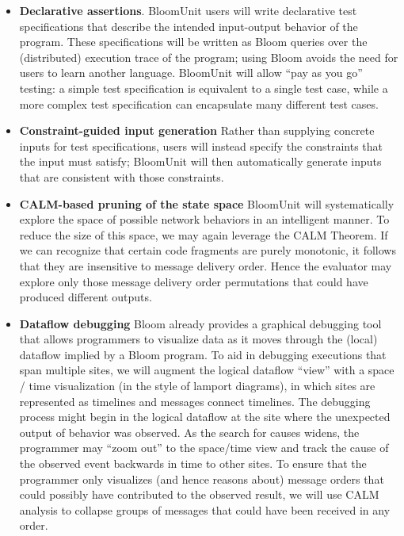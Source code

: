 \begin{itemize}
\item \textbf{Declarative assertions}.
BloomUnit users will write declarative test specifications that describe the 
intended input-output behavior of the program. These specifications will be 
written 
as Bloom queries over the (distributed) execution trace of the program; 
using Bloom avoids the need for users to learn another language. 
BloomUnit will allow ``pay as you go'' testing: a simple test specification 
is equivalent to a single test case, while a more complex test specification 
can encapsulate many different test cases.


\item \textbf{Constraint-guided input generation}
Rather than supplying concrete inputs for test specifications, users will 
instead 
specify the constraints that the input must satisfy; BloomUnit will then 
automatically generate inputs that are consistent with those constraints.

\item \textbf{CALM-based pruning of the state space}
BloomUnit will systematically explore the space of
possible network behaviors in an intelligent manner. To reduce the size of this space, we may again
leverage the CALM Theorem.
If we can recognize that certain code fragments are purely monotonic, it follows 
that they are insensitive to message delivery order.
Hence the evaluator may explore only those message delivery order permutations
that could have produced different outputs.

\item \textbf{Dataflow debugging}  Bloom already provides a graphical debugging tool that allows programmers
to visualize data as it moves through the (local) dataflow implied by a Bloom program.  To aid in debugging
executions that span multiple sites,  we will augment the logical dataflow ``view'' with a space / time visualization
(in the style of lamport diagrams), in which sites are represented as timelines and messages connect timelines.
The debugging process might begin in the logical dataflow at the site where the unexpected output of behavior was observed.
As the search for causes widens, the programmer may ``zoom out'' to the space/time view and track the cause of the observed
event backwards in time to other sites.  To ensure that the programmer only visualizes (and hence reasons about) message orders
that could possibly have contributed to the observed result, we will use CALM analysis to collapse groups of messages that
could have been received in any order.  
\end{itemize}

